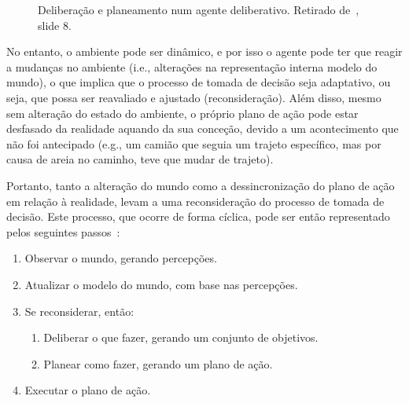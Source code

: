\begin{figure}[H]
    \begin{center}
    \end{center}
    \caption{Deliberação e planeamento num agente deliberativo.
    Retirado de~\cite{isel:iasa:slides:arq-agentes-deliberativos}, slide 8.}
    \label{fig:delib-planeamento}
\end{figure}

No entanto, o ambiente pode ser dinâmico, e por isso o agente pode ter que reagir a mudanças no ambiente (i.e., alterações na representação interna modelo do mundo), o que implica que o processo de tomada de decisão seja adaptativo, ou seja, que possa ser reavaliado e ajustado (reconsideração).
Além disso, mesmo sem alteração do estado do ambiente, o próprio plano de ação pode estar desfasado da realidade aquando da sua conceção, devido a um acontecimento que não foi antecipado (e.g., um camião que seguia um trajeto específico, mas por causa de areia no caminho, teve que mudar de trajeto).

Portanto, tanto a alteração do mundo como a dessincronização do plano de ação em relação à realidade, levam a uma reconsideração do processo de tomada de decisão.
Este processo, que ocorre de forma cíclica, pode ser então representado pelos seguintes passos~\cite{isel:iasa:slides:arq-agentes-deliberativos}:

\begin{enumerate}
    \label{enum:processo-tomada-decisao}
    \item Observar o mundo, gerando percepções.
    \item Atualizar o modelo do mundo, com base nas percepções.
    \item Se reconsiderar, então:
    \begin{enumerate}
        \item Deliberar o que fazer, gerando um conjunto de objetivos.
        \item Planear como fazer, gerando um plano de ação.
    \end{enumerate}
    \item Executar o plano de ação.
\end{enumerate}

